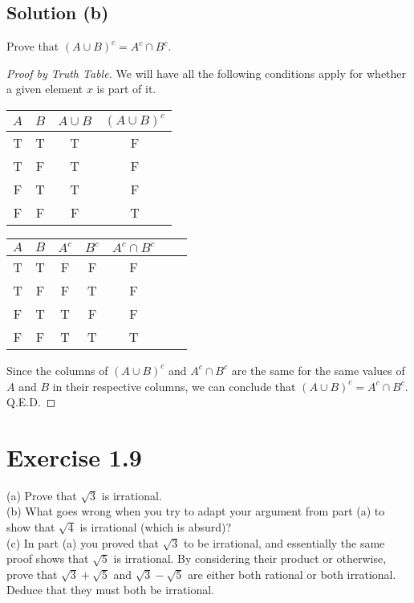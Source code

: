 \documentclass[12pt]{report}
\begin{document}
\subsection{Solution (b)}
Prove that $(A \cup B)^c = A^c \cap B^c$. 
\begin{proof}[Proof by Truth Table]
    We will have all the following conditions apply for whether a given element $x$ is part of it.
    \begin{center}
        \begin{tabular}{| c | c | c | c |}
            \hline
            $A$ &$B$    &$A \cup B$ &$(A \cup B)^c$\\
            \hline
            T   &T  &T  &F\\
            T   &F  &T  &F\\
            F   &T  &T  &F\\
            F   &F  &F  &T\\
            \hline
        \end{tabular}
        \begin{tabular}{| c | c | c | c | c | c | c |}
            \hline
            $A$ &$B$    &$A^c$  &$B^c$  &$A^c \cap B^c$\\
            \hline
            T   &T  &F  &F  &F\\
            T   &F  &F  &T  &F\\
            F   &T  &T  &F  &F\\
            F   &F  &T  &T  &T\\
            \hline
        \end{tabular}
    \end{center}

    Since the columns of $(A \cup B)^c$ and $A^c \cap B^c$ are the same for the same values of $A$ and $B$ in their respective columns, we can conclude that $(A \cup B)^c = A^c \cap B^c$.\\
    Q.E.D.
\end{proof}

\pagebreak
\section{Exercise 1.9}
(a) Prove that $\sqrt{3}$ is irrational. \\
(b) What goes wrong when you try to adapt your argument from  part (a) to show that $\sqrt{4}$ is irrational (which is absurd)? \\
(c) In part (a) you proved that $\sqrt{3}$ to be irrational, and essentially the same proof shows that $\sqrt{5}$ is irrational. By considering their product or otherwise, prove that $\sqrt{3} + \sqrt{5}$ and $\sqrt{3} - \sqrt{5}$ are either both rational or both irrational. Deduce that they must both be irrational. 
\end{document}

